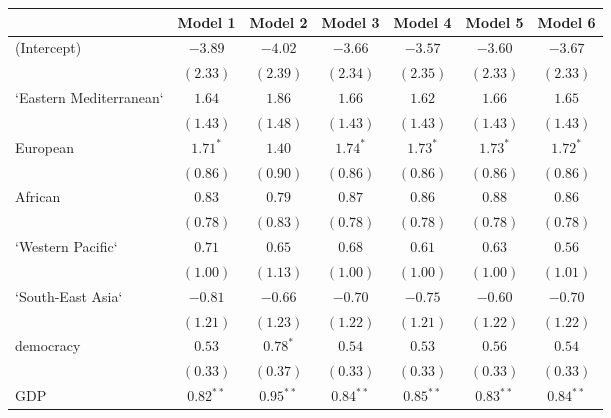 
\begin{table}[!h]
\begin{center}
\begin{tabular}{l c c c c c c }
\toprule
 & Model 1 & Model 2 & Model 3 & Model 4 & Model 5 & Model 6 \\
\midrule
(Intercept)             & $-3.89$      & $-4.02$      & $-3.66$      & $-3.57$      & $-3.60$      & $-3.67$      \\
                        & $(2.33)$     & $(2.39)$     & $(2.34)$     & $(2.35)$     & $(2.33)$     & $(2.33)$     \\
`Eastern Mediterranean` & $1.64$       & $1.86$       & $1.66$       & $1.62$       & $1.66$       & $1.65$       \\
                        & $(1.43)$     & $(1.48)$     & $(1.43)$     & $(1.43)$     & $(1.43)$     & $(1.43)$     \\
European                & $1.71^{*}$   & $1.40$       & $1.74^{*}$   & $1.73^{*}$   & $1.73^{*}$   & $1.72^{*}$   \\
                        & $(0.86)$     & $(0.90)$     & $(0.86)$     & $(0.86)$     & $(0.86)$     & $(0.86)$     \\
African                 & $0.83$       & $0.79$       & $0.87$       & $0.86$       & $0.88$       & $0.86$       \\
                        & $(0.78)$     & $(0.83)$     & $(0.78)$     & $(0.78)$     & $(0.78)$     & $(0.78)$     \\
`Western Pacific`       & $0.71$       & $0.65$       & $0.68$       & $0.61$       & $0.63$       & $0.56$       \\
                        & $(1.00)$     & $(1.13)$     & $(1.00)$     & $(1.00)$     & $(1.00)$     & $(1.01)$     \\
`South-East Asia`       & $-0.81$      & $-0.66$      & $-0.70$      & $-0.75$      & $-0.60$      & $-0.70$      \\
                        & $(1.21)$     & $(1.23)$     & $(1.22)$     & $(1.21)$     & $(1.22)$     & $(1.22)$     \\
democracy               & $0.53$       & $0.78^{*}$   & $0.54$       & $0.53$       & $0.56$       & $0.54$       \\
                        & $(0.33)$     & $(0.37)$     & $(0.33)$     & $(0.33)$     & $(0.33)$     & $(0.33)$     \\
GDP                     & $0.82^{**}$  & $0.95^{**}$  & $0.84^{**}$  & $0.85^{**}$  & $0.83^{**}$  & $0.84^{**}$  \\

\end{tabular}
\end{center}
\end{table}
